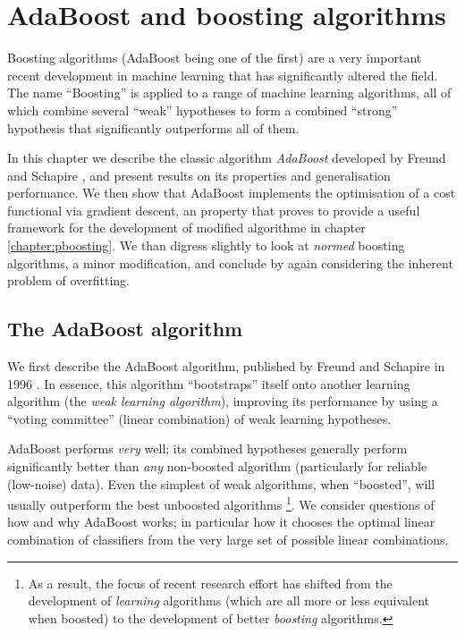 

\chapter{AdaBoost and boosting algorithms}
\label{chapter:boosting}

Boosting algorithms (AdaBoost being one of the first) are a very
important recent development in machine learning that has
significantly altered the field.  The name ``Boosting'' is applied to
a range of  machine learning algorithms, all of which combine several
``weak'' hypotheses to form a combined ``strong'' hypothesis that
significantly outperforms all of them.

In this chapter we describe the classic algorithm \emph{AdaBoost}
developed by Freund and Schapire \cite{Freund96}, and present results
on its properties and generalisation performance.  We then show that
AdaBoost implements the optimisation of a cost functional via gradient
descent, an property that proves to provide a useful framework for the
development of modified algorithme in chapter \ref{chapter:pboosting}.
We than digress slightly to look at \emph{normed} boosting algorithms,
a minor modification, and conclude by again considering the inherent
problem of overfitting.

\section{The AdaBoost algorithm}

We first describe the AdaBoost algorithm, published by Freund and
Schapire in 1996 \cite{Freund96}.  In essence, this algorithm 
``bootstraps'' itself onto another learning algorithm (the \emph{weak
learning algorithm}), improving its performance by using a ``voting
committee'' (linear combination) of weak learning hypotheses.

AdaBoost performs \emph{very} well; its combined hypotheses generally
perform significantly better than \emph{any} non-boosted algorithm
(particularly for reliable (low-noise) data).  Even the simplest of
weak algorithms, when ``boosted'', will usually outperform the best
unboosted algorithms%
\footnote{As a result, the focus of recent research effort has shifted
from the development of \emph{learning} algorithms (which are all more 
or less equivalent when boosted) to the development of better
\emph{boosting} algorithms.}.
We consider questions of how and why AdaBoost works; in particular how
it chooses the optimal linear combination of classifiers from the very
large set of possible linear combinations. 

